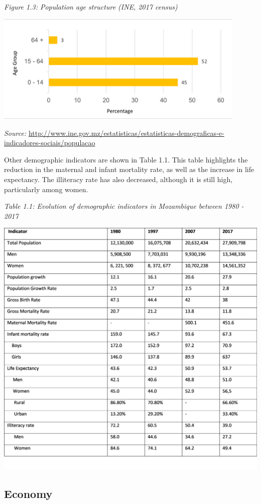 \documentclass[
]{book}
\begin{document}
\emph{Figure 1.3: Population age structure (INE, 2017 census)}

\includegraphics[width=0.9\textwidth,height=\textheight]{Picture3.png}

\emph{Source:} \url{http://www.ine.gov.mz/estatisticas/estatisticas-demograficas-e-indicadores-sociais/populacao}

Other demographic indicators are shown in Table 1.1. This table highlights the reduction in the maternal and infant mortality rate, as well as the increase in life expectancy. The illiteracy rate has also decreased, although it is still high, particularly among women.

\emph{Table 1.1: Evolution of demographic indicators in Mozambique between 1980 - 2017}

\includegraphics{Picture5.png}

\hypertarget{economy}{%
\subsection{Economy}\label{economy}}
\end{document}
